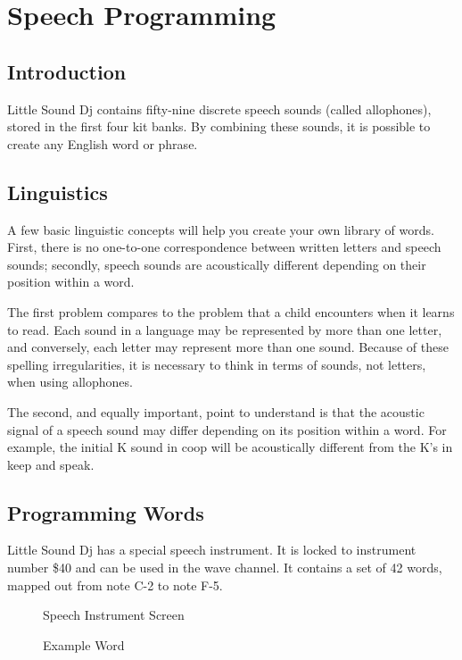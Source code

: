 \chapter{Speech Programming}
\label{speech-chapter}

\section{Introduction}

Little Sound Dj contains fifty-nine discrete speech sounds (called allophones), stored in the first four kit banks. By combining these sounds, it is possible to create any English word or phrase.

\section{Linguistics}

A few basic linguistic concepts will help you create your own library of words. First, there is no one-to-one correspondence between written letters and speech sounds; secondly, speech sounds are acoustically different depending on their position within a word.

The first problem compares to the problem that a child encounters when it learns to read. Each sound in a language may be represented by more than one letter, and conversely, each letter may represent more than one sound. Because of these spelling irregularities, it is necessary to think in terms of sounds, not letters, when using allophones.

The second, and equally important, point to understand is that the acoustic signal of a speech sound may differ depending on its position within a word. For example, the initial K sound in coop will be acoustically different from the K's in keep and speak.

\section{Programming Words}

Little Sound Dj has a special speech instrument. It is locked to instrument number \$40 and can be used in the wave channel. It contains a set of 42 words, mapped out from note C-2 to note F-5.

\begin{figure}[htpb]
	\begin{center}
	\end{center}
	\caption{Speech Instrument Screen}
	\label{fig:speech}
\end{figure}
\begin{figure}[htpb]
	\begin{center}
	\end{center}
	\caption{Example Word}
	\label{fig:word}
\end{figure}


